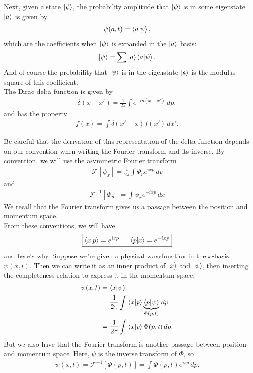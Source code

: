 \documentclass{book}
\theoremstyle{definition}
\newcommand{\f}[2]{\frac{#1}{#2}}
\begin{document}
Next, given a state $\ket{\psi}$, the probability amplitude that $\ket{\psi}$ is in some eigenstate $\ket{a}$ is given by
\begin{align}
\psi(a,t) = \braket{a}{\psi},
\end{align}
which are the coefficients when $\ket{\psi}$ is expanded in the $\ket{a}$ basis:
\begin{align}
\ket{\psi} = \sum \ket{a}\bra{a}\ket{\psi}.
\end{align}
And of course the probability that $\ket{\psi}$ is in the eigenstate $\ket{a}$ is the modulus square of this coefficient.\\



The Dirac delta function is given by
\begin{align}
\delta(x - x') = \f{1}{2\pi}\int e^{-ip(x-x')}\,dp,
\end{align}
and has the property
\begin{align}
f(x) = \int \delta(x'-x) f(x')\,dx'.
\end{align}

Be careful that the derivation of this representation of the delta function depends on our convention when writing the Fourier transform and its inverse. By convention, we will use the asymmetric Fourier transform 
\begin{align}
\boxed{\mathcal{F}[\psi_x] = \f{1}{2\pi}\int \Phi_p e^{ixp}\,dp}
\end{align} 
and
\begin{align}
\boxed{\mathcal{F}^{-1}[\Phi_p] = \int \psi_x e^{-ixp}\,dx}
\end{align}
We recall that the Fourier transform gives us a passage between the position and momentum space. \\

From these conventions, we will have
\begin{align}
\boxed{\braket{x}{p} = e^{ixp} \hspace{0.5cm} \braket{p}{x} = e^{-ixp}}
\end{align}
and here's why. Suppose we're given a physical wavefunction in the $x$-basis: $\psi(x,t)$. Then we can write it as an inner product of $\ket{x}$ and $\ket{\psi}$, then inserting the completeness relation to express it in the momentum space:
\begin{align}
\psi(x,t) &= \braket{x}{\psi}\\
&= \f{1}{2\pi}\int \bra{x}\ket{p}\underbrace{\bra{p}\ket{\psi}}_{\Phi(p,t)}\,dp\\
&= \f{1}{2\pi}\int \bra{x}\ket{p} \Phi(p,t)\,dp.
\end{align}
But we also have that the Fourier transform is another passage between position and momentum space. Here, $\psi$ is the inverse transform of $\Phi$, so
\begin{align}
\psi(x,t) = \mathcal{F}^{-1}[\Phi(p,t)] = \int \Phi(p,t)e^{ixp}\,dp.
\end{align}
\end{document}
